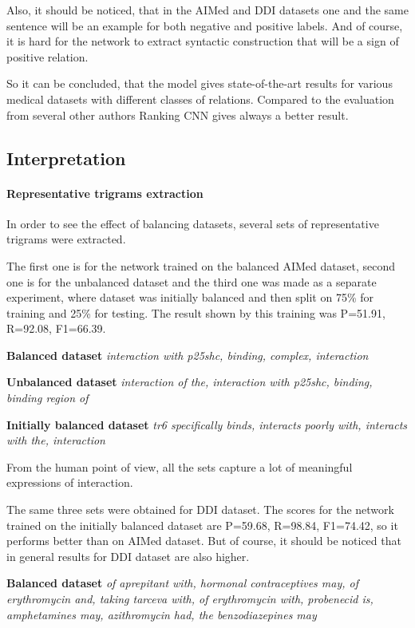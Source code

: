 Also, it should be noticed, that in the AIMed and DDI datasets one and the same sentence will be an 
example for both negative and positive labels. And of course, it is hard for the network to extract 
syntactic construction that will be a sign of positive relation. 

So it can be concluded, that the model gives state-of-the-art results for various medical 
datasets with different classes of relations. Compared to the evaluation from several other authors Ranking
CNN gives always a better result. 


\subsection{Interpretation}
\paragraph{Representative trigrams extraction} 
In order to see the effect of balancing datasets, several sets of representative trigrams were 
extracted. 

The first one is for the network trained on the balanced AIMed dataset, second one is for the unbalanced 
dataset and the third one was made as a separate experiment, where dataset was initially 
balanced and then split on 75\% for training and 25\% for testing. The result shown by this 
training was P=51.91, R=92.08, F1=66.39.

\textbf{Balanced dataset} \textit{interaction with p25shc, binding, complex, interaction}

\textbf{Unbalanced dataset} \textit{interaction of the, interaction with p25shc, binding, binding region of}

\textbf{Initially balanced dataset} \textit{tr6 specifically binds, interacts poorly with, interacts with the, interaction}

From the human point of view, all the sets capture a lot of meaningful expressions of interaction.

The same three sets were obtained for DDI dataset. The scores for the network trained on 
the initially balanced dataset are P=59.68, R=98.84, F1=74.42, so it performs better than on 
AIMed dataset. But of course, it should be noticed that in general results for DDI dataset are also 
higher.

\textbf{Balanced dataset} \textit{of aprepitant with, hormonal contraceptives may, of erythromycin and, taking tarceva with, of erythromycin with, probenecid is, amphetamines may, azithromycin had, the benzodiazepines may}


